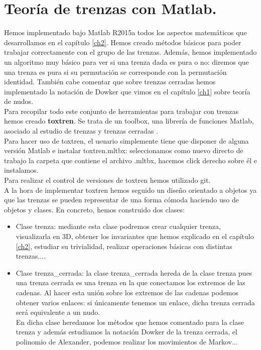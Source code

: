 \newpage
\section{Teoría de trenzas con Matlab.}
Hemos implementado bajo Matlab R2015a todos los aspectos matemáticos que desarrollamos en el capítulo \ref{ch2}. Hemos creado métodos básicos para poder trabajar correctamente con el grupo de las trenzas. Además, hemos implementado un algoritmo muy básico para ver si una trenza dada es pura o no: diremos que una trenza es pura si su permutación se corresponde con la permutación identidad. También cabe comentar que sobre trenzas cerradas hemos implementado la notación de Dowker que vimos en el capítulo \ref{ch1} sobre teoría de nudos. \\

Para recopilar todo este conjunto de herramientas para trabajar con trenzas hemos creado \textbf{toxtren}. Se trata de un toolbox, una librería de funciones Matlab, asociado al estudio de trenzas y trenzas cerradas \cite{6}.  \\ 

Para hacer uso de toxtren, el usuario simplemente tiene que disponer de alguna versión Matlab e instalar toxtren.mltbx: seleccionamos como nuevo directo de trabajo la carpeta que contiene el archivo .mltbx, hacemos click derecho sobre él e instalamos. \\

Para realizar el control de versiones de toxtren hemos utilizado git.\\

A la hora de implementar toxtren hemos seguido un diseño orientado a objetos ya que las trenzas se pueden representar de una forma cómoda haciendo uso de objetos y clases. En concreto, hemos construido dos clases: 
\begin{itemize}
	\item Clase trenza: mediante esta clase podremos crear cualquier trenza, visualizarla en 3D, obtener los invariantes que hemos explicado en el capítulo \ref{ch2}, estudiar su trivialidad, realizar operaciones básicas con distintas trenzas....
	\item Clase trenza\_cerrada: la clase trenza\_cerrada hereda de la clase trenza pues una trenza cerrada es una trenza en la que conectamos los extremos de las cadenas. Al hacer esta unión sobre los extremos de las cadenas podemos obtener varios enlaces: si únicamente tenemos un enlace, dicha trenza cerrada será equivalente a un nudo. \\
	En dicha clase heredamos los métodos que hemos comentado para la clase trenza y además estudiamos la notación Dowker de la trenza cerrada, el polinomio de Alexander, podemos realizar los movimientos de Markov...
\end{itemize} 

